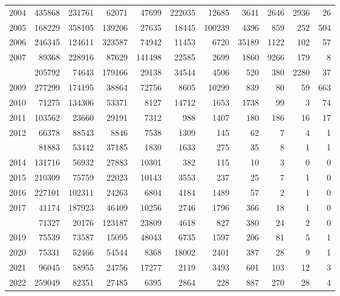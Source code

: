\documentclass[
]{article}
\begin{document}
\begin{longtable}[t]{lrrrrrrrrrr}
2004 & 435868 & 231761 & 62071 & 47699 & 222035 & 12685 & 3641 & 2646 & 2936 & 26\\
2005 & 168229 & 358105 & 139206 & 27635 & 18445 & 100239 & 4396 & 859 & 252 & 504\\
2006 & 246345 & 124611 & 323587 & 74942 & 11453 & 6720 & 35189 & 1122 & 102 & 57\\
2007 & 89368 & 228916 & 87629 & 141498 & 22585 & 2699 & 1860 & 9266 & 179 & 8\\
\addlinespace
2008 & 205792 & 74643 & 179166 & 29138 & 34544 & 4506 & 520 & 380 & 2280 & 37\\
2009 & 277299 & 174195 & 38864 & 72756 & 8605 & 10299 & 839 & 80 & 59 & 663\\
2010 & 71275 & 134306 & 53371 & 8127 & 14712 & 1653 & 1738 & 99 & 3 & 74\\
2011 & 103562 & 23660 & 29191 & 7312 & 988 & 1407 & 180 & 186 & 16 & 17\\
2012 & 66378 & 88543 & 8846 & 7538 & 1309 & 145 & 62 & 7 & 4 & 1\\
\addlinespace
2013 & 81883 & 53442 & 37185 & 1830 & 1633 & 275 & 35 & 8 & 1 & 1\\
2014 & 131716 & 56932 & 27883 & 10301 & 382 & 115 & 10 & 3 & 0 & 0\\
2015 & 210309 & 75759 & 22023 & 10143 & 3553 & 237 & 25 & 7 & 1 & 0\\
2016 & 227101 & 102311 & 24263 & 6804 & 4184 & 1489 & 57 & 2 & 1 & 0\\
2017 & 41174 & 187923 & 46409 & 10256 & 2746 & 1796 & 366 & 18 & 1 & 0\\
\addlinespace
2018 & 71327 & 20176 & 123187 & 23809 & 4618 & 827 & 380 & 24 & 2 & 0\\
2019 & 75539 & 73587 & 15095 & 48043 & 6735 & 1597 & 206 & 81 & 5 & 1\\
2020 & 75331 & 52466 & 54544 & 8368 & 18002 & 2401 & 387 & 28 & 9 & 1\\
2021 & 96045 & 58955 & 24756 & 17277 & 2119 & 3493 & 601 & 103 & 12 & 3\\
2022 & 259049 & 82351 & 27485 & 6395 & 2864 & 228 & 887 & 270 & 28 & 4\\*
\end{longtable}
\end{document}
